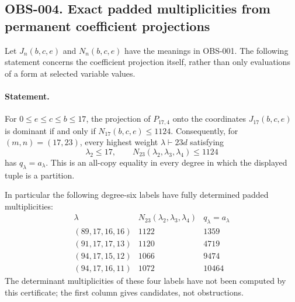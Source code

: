 \subsection{OBS-004. Exact padded multiplicities from permanent coefficient projections}

Let $J_n(b,c,e)$ and $N_n(b,c,e)$ have the meanings in OBS-001.
The following statement concerns the coefficient projection itself,
rather than only evaluations of a form at selected variable values.

\paragraph{Statement.}
For $0\le e\le c\le b\le17$, the projection of
$P_{17,4}$ onto the coordinates $J_{17}(b,c,e)$ is dominant if and
only if $N_{17}(b,c,e)\le1124$.
Consequently, for $(m,n)=(17,23)$, every highest weight
$\lambda\vdash23d$ satisfying
\[
 \lambda_2\le17,\qquad
 N_{23}(\lambda_2,\lambda_3,\lambda_4)\le1124
\]
has $q_\lambda=a_\lambda$. This is an all-copy equality in every
degree in which the displayed tuple is a partition.

In particular the following degree-six labels have fully determined
padded multiplicities:
\[
\begin{array}{c|r|r}
\lambda&N_{23}(\lambda_2,\lambda_3,\lambda_4)&q_\lambda=a_\lambda\\\hline
(89,17,16,16)&1122&1359\\
(91,17,17,13)&1120&4719\\
(94,17,15,12)&1066&9474\\
(94,17,16,11)&1072&10464
\end{array}
\]
The determinant multiplicities of these four labels have not been
computed by this certificate; the first column gives candidates, not
obstructions.


